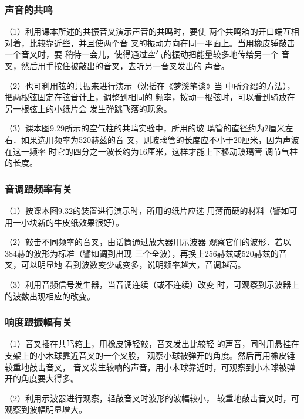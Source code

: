\subsubsection{声音的共鸣}
（1）利用课本所述的共振音叉演示声音的共鸣时，要使
两个共鸣箱的开口端互相对着，比较靠近些，并且使两个音
叉的振动方向在同一平面上。当用橡皮锤敲击一个音叉时，要
稍待一会儿，使得通过空气的振动把能量较多地传给另一个
音叉，然后用手按住被敲出的音叉，去听另一音叉发出的
声音。

（2）也可利用弦的共振来进行演示（沈括在《梦溪笔谈》当
中所介绍的方法），把两根弦固定在弦音计上，调整到相同的
频率，拨动一根弦时，可以看到骑放在另一根弦上的小纸片会
发生弹跳飞落的现象。

（3）课本图9.29所示的空气柱的共鸣实验中，所用的玻
璃管的直径约为2厘米左右．如果选用频率为520赫兹的音
叉，则玻璃管的长度应不小于20厘米，因为声波在这一频率
时它的四分之一波长约为16厘米，这样才能上下移动玻璃管
调节气柱的长度。

\subsubsection{音调跟频率有关}
（1）按课本图9.32的装置进行演示时，所用的纸片应选
用薄而硬的材料（譬如可用一小块新的牛皮纸效果很好）。

（2）敲击不同频率的音叉，由话筒通过放大器用示波器
观察它们的波形．若以384赫的波形为标准（譬如调到出现
三个全波），再换上256赫兹或520赫兹的音叉，可以明显地
看到波数变少或变多，说明频率越大，音调越高。

（3）利用音频信号发生器，当音调连续（或不连续）改变
时，可观察到示波器上的波数出现相应的改变。

\subsubsection{响度跟振幅有关}
（1）音叉插在共鸣箱上，用橡皮锤轻敲，音叉发出比较轻
的声音，同时用悬挂在支架上的小木球靠近音叉的一个叉股，
观察小球被弹开的角度。然后再用橡皮锤较重地敲击音叉，
音叉发生较响的声音，用小木球靠近时，可观察到小木球被弹
开的角度要大得多。

（2）利用示波器进行观察，轻敲音叉时波形的波幅较小，
较重地敲击音叉时，可观察到波幅明显增大。

